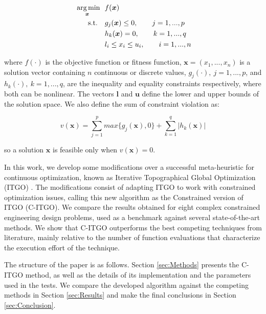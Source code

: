 \begin{equation}\label{eq:func}
    \begin{aligned}
    \underset{\bm{x}}{\text{\fnt{10} arg\,min}} \ \ & f(\bm{x}) \\
    \text{s.t.} \quad & g_j(\bm{x}) \leq 0, \qquad j = 1, ..., p  \\
                      & h_k(\bm{x}) = 0, \qquad k = 1, ..., q  \\ 
                      & l_i \leq x_i \leq u_i, \qquad i = 1, ..., n 
    \end{aligned}
\end{equation}

\noindent
where $f(\cdot)$ is the objective function or fitness function, $\bm{x} = (x_1, ..., x_n)$ is a solution vector containing $n$ continuous or discrete values, $g_j(\cdot), \ j = 1, ..., p$, and $h_k(\cdot), \ k = 1, ..., q$, are the inequality and equality constraints respectively, where both can be nonlinear. The vectors $\bm{l}$ and $\bm{u}$ define the lower and upper bounds of the solution space. We also define the sum of constraint violation as:

\begin{equation}\label{eq:viol}
    v(\bm{x}) = \sum_{j=1}^p max\{g_j(\bm{x}), 0\} + \sum_{k=1}^q |h_k(\bm{x})|
\end{equation}

\noindent
so a solution $\bm{x}$ is feasible only when $v(\bm{x}) = 0$. 

In this work, we develop some modifications over a successful meta-heuristic for continuous optimization, known as Iterative Topographical Global Optimization (ITGO) \cite{ITGO0}. The modifications consist of adapting ITGO to work with constrained optimization issues, calling this new algorithm as the Constrained version of ITGO (C-ITGO). We compare the results obtained for eight complex constrained engineering design problems, used as a benchmark against several state-of-the-art methods. We show that C-ITGO outperforms the best competing techniques from literature, mainly relative to the number of function evaluations that characterize the execution effort of the technique.

The structure of the paper is as follows. Section \ref{sec:Methods} presents the C-ITGO method, as well as the details of its implementation and the parameters used in the tests. We compare the developed algorithm against the competing methods in Section \ref{sec:Results} and make the final conclusions in Section \ref{sec:Conclusion}.